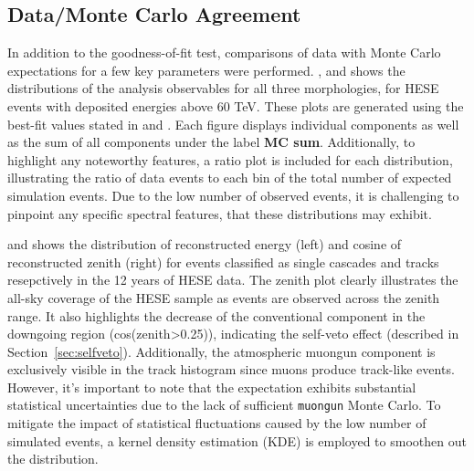 \subsection{Data/Monte Carlo Agreement}
\label{sec:data_mc}
In addition to the goodness-of-fit test, comparisons of data with Monte Carlo expectations for a few key parameters were performed. ,  and  shows the distributions of the analysis observables for all three morphologies, for HESE events with deposited energies above 60 TeV. These plots are generated using the best-fit values stated in  and . Each figure displays individual components as well as the sum of all components under the label \textbf{MC sum}. Additionally, to highlight any noteworthy features, a ratio plot is included for each distribution, illustrating the ratio of data events to each bin of the total number of expected simulation events. Due to the low number of observed events, it is challenging to pinpoint any specific spectral features, that these distributions may exhibit. 

 and  shows the distribution of reconstructed energy (left) and cosine of reconstructed zenith (right) for events classified as single cascades and tracks resepctively in the 12 years of HESE data. The zenith plot clearly illustrates the all-sky coverage of the HESE sample as events are observed across the zenith range. It also highlights the decrease of the conventional component in the downgoing region (cos(zenith>0.25)), indicating the self-veto effect (described in Section~\ref{sec:selfveto}). Additionally, the atmospheric muongun component is exclusively visible in the track histogram since muons produce track-like events. However, it's important to note that the expectation exhibits substantial statistical uncertainties due to the lack of sufficient \texttt{muongun} Monte Carlo. To mitigate the impact of statistical fluctuations caused by the low number of simulated events, a kernel density estimation (KDE) is employed to smoothen out the distribution. 

